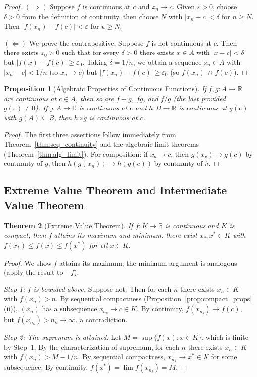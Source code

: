 \documentclass[11pt,a4paper]{article}
\theoremstyle{definition}
\theoremstyle{plain}
\newtheorem{theorem}{Theorem}[section]
\newtheorem{proposition}[theorem]{Proposition}
\theoremstyle{remark}
\newcommand{\R}{\mathbb{R}}
\begin{document}
\begin{proof}
$(\Rightarrow)$ Suppose $f$ is continuous at $c$ and $x_n \to c$. Given
$\varepsilon > 0$, choose $\delta > 0$ from the definition of continuity, then
choose $N$ with $|x_n - c| < \delta$ for $n \ge N$. Then
$|f(x_n) - f(c)| < \varepsilon$ for $n \ge N$.

$(\Leftarrow)$ We prove the contrapositive. Suppose $f$ is not continuous at $c$.
Then there exists $\varepsilon_0 > 0$ such that for every $\delta > 0$ there exists
$x \in A$ with $|x - c| < \delta$ but $|f(x) - f(c)| \ge \varepsilon_0$. Taking
$\delta = 1/n$, we obtain a sequence $x_n \in A$ with $|x_n - c| < 1/n$ (so
$x_n \to c$) but $|f(x_n) - f(c)| \ge \varepsilon_0$ (so $f(x_n) \not\to f(c)$).
\end{proof}

\begin{proposition}[Algebraic Properties of Continuous Functions]
\label{prop:cont_algebra}
If $f, g : A \to \R$ are continuous at $c \in A$, then so are $f + g$, $fg$,
and $f/g$ (the last provided $g(c) \neq 0$). If $g : A \to \R$ is continuous
at $c$ and $h : B \to \R$ is continuous at $g(c)$ with $g(A) \subseteq B$,
then $h \circ g$ is continuous at $c$.
\end{proposition}

\begin{proof}
The first three assertions follow immediately from Theorem~\ref{thm:seq_continuity}
and the algebraic limit theorems (Theorem~\ref{thm:alg_limit}). For composition:
if $x_n \to c$, then $g(x_n) \to g(c)$ by continuity of $g$, then
$h(g(x_n)) \to h(g(c))$ by continuity of $h$.
\end{proof}

\subsection{Extreme Value Theorem and Intermediate Value Theorem}
\label{subsec:evt_ivt}

\begin{theorem}[Extreme Value Theorem]
\label{thm:evt}
If $f : K \to \R$ is continuous and $K$ is compact, then $f$ attains its maximum
and minimum: there exist $x_*, x^* \in K$ with $f(x_*) \le f(x) \le f(x^*)$ for
all $x \in K$.
\end{theorem}

\begin{proof}
We show $f$ attains its maximum; the minimum argument is analogous (apply the
result to $-f$).

\emph{Step 1: $f$ is bounded above.} Suppose not. Then for each $n$ there exists
$x_n \in K$ with $f(x_n) > n$. By sequential compactness
(Proposition~\ref{prop:compact_props}(ii)), $(x_n)$ has a subsequence
$x_{n_k} \to c \in K$. By continuity, $f(x_{n_k}) \to f(c)$, but
$f(x_{n_k}) > n_k \to \infty$, a contradiction.

\emph{Step 2: The supremum is attained.} Let $M = \sup\{f(x) : x \in K\}$, which
is finite by Step~1. By the characterization of supremum, for each $n$ there
exists $x_n \in K$ with $f(x_n) > M - 1/n$. By sequential compactness,
$x_{n_k} \to x^* \in K$ for some subsequence. By continuity,
$f(x^*) = \lim f(x_{n_k}) = M$.
\end{proof}
\end{document}
